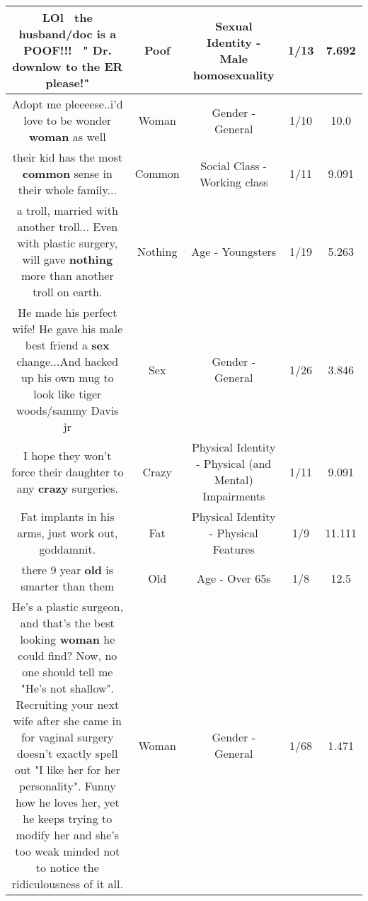 \documentclass[11pt]{article}
\newlength\mylength
\begin{document}
\begin{center}
\begin{longtable}{|C{.65\mylength}|C{.30\mylength}|C{.12\mylength}|C{.12\mylength}|C{.12\mylength}|}
  \small LOl  the husband/doc is a \textbf{POOF}!!!  " Dr. downlow to the ER please!"\normalsize   & Poof & Sexual Identity - Male homosexuality & 1/13 & 7.692 \\  \hline
  \small Adopt me pleeeese..i'd love to be wonder \textbf{woman} as well\normalsize   & Woman & Gender - General & 1/10 & 10.0 \\  \hline
  \small their kid has the most \textbf{common} sense in their whole family...\normalsize   & Common & Social Class - Working class & 1/11 & 9.091 \\  \hline
  \small a troll, married with another troll... Even with plastic surgery, will gave \textbf{nothing} more than another troll on earth.\normalsize   & Nothing & Age - Youngsters & 1/19 & 5.263 \\  \hline
  \small He made his perfect wife! He gave his male best friend a \textbf{sex} change...And hacked up his own mug to look like tiger woods/sammy Davis jr\normalsize   & Sex & Gender - General & 1/26 & 3.846 \\  \hline
  \small I hope they won't force their daughter to any \textbf{crazy} surgeries.\normalsize   & Crazy & Physical Identity - Physical (and Mental) Impairments & 1/11 & 9.091 \\  \hline
  \small Fat implants in his arms, just work out, goddamnit.\normalsize   & Fat & Physical Identity - Physical Features & 1/9 & 11.111 \\  \hline
  \small there 9 year \textbf{old} is smarter than them\normalsize   & Old & Age - Over 65s & 1/8 & 12.5 \\  \hline
  \small He's a plastic surgeon, and that's the best looking \textbf{woman} he could find? Now, no one should tell me "He's not shallow". Recruiting your next wife after she came in for vaginal surgery doesn't exactly spell out "I like her for her personality". Funny how he loves her, yet he keeps trying to modify her and she's too weak minded not to notice the ridiculousness of it all.\normalsize   & Woman & Gender - General & 1/68 & 1.471 \\  \hline

\end{longtable}
\end{center}
\end{document}
